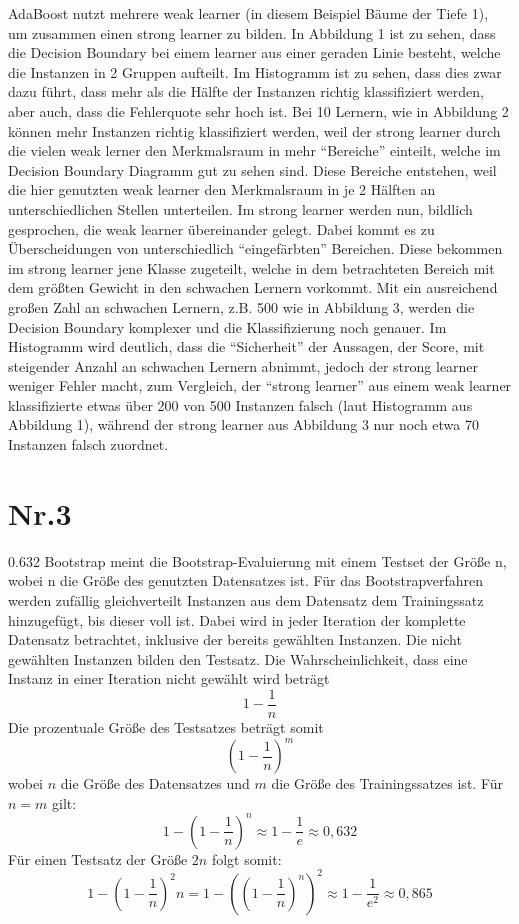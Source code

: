 \documentclass[a4paper,11pt,twoside]{article}
\begin{document}
AdaBoost nutzt mehrere weak learner (in diesem Beispiel Bäume der Tiefe 1), um zusammen einen strong learner zu bilden. In Abbildung 1 ist zu sehen, dass die Decision Boundary bei einem learner aus einer geraden Linie besteht, welche die Instanzen in 2 Gruppen aufteilt. Im Histogramm ist zu sehen, dass dies zwar dazu führt, dass mehr als die Hälfte der Instanzen richtig klassifiziert werden, aber auch, dass die Fehlerquote sehr hoch ist. Bei 10 Lernern, wie in Abbildung 2 können mehr Instanzen richtig klassifiziert werden, weil der strong learner durch die vielen weak lerner den Merkmalsraum in mehr "`Bereiche"' einteilt, welche im Decision Boundary Diagramm gut zu sehen sind. Diese Bereiche entstehen, weil die hier genutzten weak learner den Merkmalsraum in je 2 Hälften an unterschiedlichen Stellen unterteilen. Im strong learner werden nun, bildlich gesprochen, die weak learner übereinander gelegt. Dabei kommt es zu Überscheidungen von unterschiedlich "`eingefärbten"' Bereichen. Diese bekommen im strong learner jene Klasse zugeteilt, welche in dem betrachteten Bereich mit dem größten Gewicht in den schwachen Lernern vorkommt. Mit ein ausreichend großen Zahl an schwachen Lernern, z.B. 500 wie in Abbildung 3, werden die Decision Boundary komplexer und die Klassifizierung noch genauer. Im Histogramm wird deutlich, dass die "`Sicherheit"' der Aussagen, der Score, mit steigender Anzahl an schwachen Lernern abnimmt, jedoch der strong learner weniger Fehler macht, zum Vergleich, der "`strong learner"' aus einem weak learner klassifizierte etwas über 200 von 500 Instanzen falsch (laut Histogramm aus Abbildung 1), während der strong learner aus Abbildung 3 nur noch etwa 70 Instanzen falsch zuordnet.

\section*{Nr.3}
0.632 Bootstrap meint die Bootstrap-Evaluierung mit einem Testset der Größe n, wobei n die Größe des genutzten Datensatzes ist. Für das Bootstrapverfahren werden zufällig gleichverteilt Instanzen aus dem Datensatz dem Trainingssatz hinzugefügt, bis dieser voll ist. Dabei wird in jeder Iteration der komplette Datensatz betrachtet, inklusive der bereits gewählten Instanzen. Die nicht gewählten Instanzen bilden den Testsatz.
Die Wahrscheinlichkeit, dass eine Instanz in einer Iteration nicht gewählt wird beträgt
\[ 1 - \frac{1}{n}  \]
Die prozentuale Größe des Testsatzes beträgt somit
\[ (1 - \frac{1}{n})^m \]
wobei $n$ die Größe des Datensatzes und $m$ die Größe des Trainingssatzes ist. Für $n = m$ gilt:
\[ 1 - (1 - \frac{1}{n})^n \approx 1 - \frac{1}{e} \approx 0,632 \]
Für einen Testsatz der Größe $2n$  folgt somit:
\[ 1 - (1 - \frac{1}{n})^2n = 1 - \left((1 - \frac{1}{n})^n\right)^2  \approx 1 - \frac{1}{e^2} \approx 0,865 \]
\end{document}
